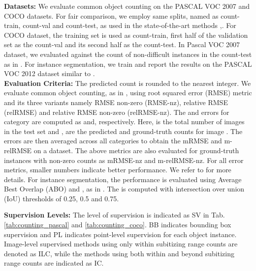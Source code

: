 \documentclass[10pt,twocolumn,letterpaper]{article}
\begin{document}
\noindent\textbf{Datasets:}
We evaluate common object counting on the PASCAL VOC 2007 \cite{pascal_2012} and COCO \cite{coco_eccv2014} datasets. For fair comparison, we employ same splits, named as count-train, count-val and count-test, as used in the state-of-the-art methods \cite{WhereAreBlobsECCV18},\cite{Chattopadhyay_2017_CVPR}. For COCO dataset, the training set is used as count-train, first half of the validation set as the count-val and its second half as the count-test. In Pascal VOC 2007 dataset, we evaluated against the count of  non-difficult instances in the count-test as in  \cite{WhereAreBlobsECCV18}. 
For instance segmentation, we train and report the results on the PASCAL VOC 2012 dataset similar to \cite{PRM}.\\
\noindent\textbf{Evaluation Criteria:}
The predicted count   is rounded to the nearest integer. We evaluate common object counting, as in \cite{Chattopadhyay_2017_CVPR, WhereAreBlobsECCV18}, using root squared error (RMSE) metric and its three variants namely RMSE non-zero (RMSE-nz), relative RMSE (relRMSE) and relative RMSE non-zero (relRMSE-nz). The  and   errors for category  are computed as  and,   respectively. Here,   is the total number of images in the test set and ,  are the predicted and ground-truth counts for image .  The errors are then averaged across all categories to obtain the mRMSE and m-relRMSE on a dataset. The above metrics are also evaluated for ground-truth instances with non-zero counts as mRMSE-nz and m-relRMSE-nz. For all error metrics, smaller numbers indicate better performance. We refer to  \cite{Chattopadhyay_2017_CVPR} for more details. For instance segmentation, the performance is evaluated using Average Best Overlap (ABO) \cite{ABO_2015} and , as in \cite{PRM}. The  is computed with intersection over union (IoU) thresholds of 0.25, 0.5 and 0.75.





 \noindent\textbf{Supervision Levels:} The level of supervision is indicated as SV in Tab.  \ref{tab:counting_pascal} and \ref{tab:counting_coco}. BB indicates bounding box supervision and PL indicates point-level supervision for each object instance. Image-level supervised methods using only within subitizing range counts are denoted as ILC, while the methods using both within and beyond subitizing range counts are indicated as IC. 
\end{document}
